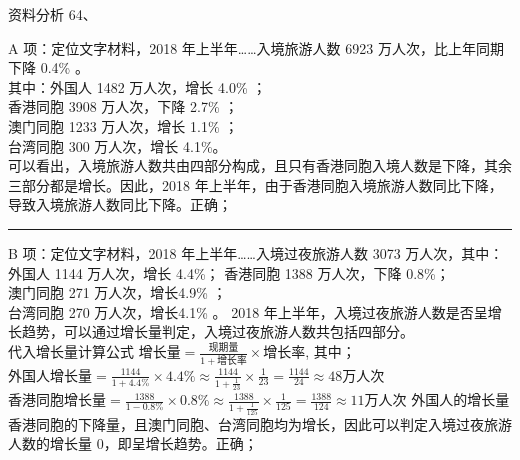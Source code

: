 \documentclass[aspectratio=169]{beamer}
\begin{document}
\begin{frame}[t]{资料分析}
    64、
    {\scriptsize
    A 项：定位文字材料，2018 年上半年……入境旅游人数 6923 万人次，比上年同期下降 0.4\% 。\\
    其中：外国人 1482 万人次，增长 4.0\% ；\\
    香港同胞 3908 万人次，下降 2.7\% ；\\
    澳门同胞 1233 万人次，增长 1.1\% ；\\
    台湾同胞 300 万人次，增长 4.1\%。\\
    可以看出，入境旅游人数共由四部分构成，且只有香港同胞入境人数是下降，其余三部分都是增长。因此，2018 年上半年，由于香港同胞入境旅游人数同比下降，导致入境旅游人数同比下降。正确；\\
    \rule{\textwidth}{0.4pt}
    B 项：定位文字材料，2018 年上半年……入境过夜旅游人数 3073 万人次，其中：外国人 1144 万人次，增长 4.4\%；
    香港同胞 1388 万人次，下降 0.8\%；\\
    澳门同胞 271 万人次，增长4.9\% ；\\
    台湾同胞 270 万人次，增长4.1\% 。
    2018 年上半年，入境过夜旅游人数是否呈增长趋势，可以通过增长量判定，入境过夜旅游人数共包括四部分。\\
    代入增长量计算公式 $\text{增长量} = \frac{\text{现期量}}{1+\text{增长率} } \times \text{增长率}$, 其中；\\
    $\text{外国人增长量} = \frac{1144}{1+4.4\%}  \times 4.4\%    \approx \frac{1144}{1+\frac{1}{23}} \times \frac{1}{23} = \frac{1144}{24} \approx 48 \text{万人次}$
    $\text{香港同胞增长量} = \frac{1388}{1-0.8\%}  \times 0.8\%    \approx \frac{1388}{1+\frac{1}{125}} \times \frac{1}{125} = \frac{1388}{124} \approx 11 \text{万人次}$
    外国人的增长量 香港同胞的下降量，且澳门同胞、台湾同胞均为增长，因此可以判定入境过夜旅游人数的增长量 0，即呈增长趋势。正确；
    }
\end{frame}                           
\end{document}
